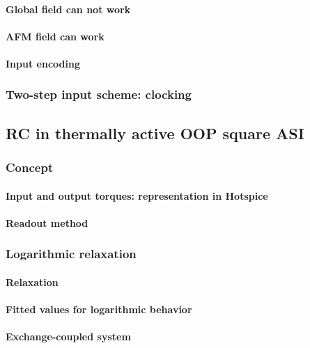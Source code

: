 \paragraph{Global field can not work} %
\paragraph{AFM field can work}
\paragraph{Input encoding} %
\subsubsection{Two-step input scheme: clocking} %

\subsection{RC in thermally active OOP square ASI}
\subsubsection{Concept} %
\paragraph{Input and output torques: representation in Hotspice}
\paragraph{Readout method}
\subsubsection{Logarithmic relaxation}
\paragraph{Relaxation}
\paragraph{Fitted values for logarithmic behavior}
\paragraph{Exchange-coupled system} %

